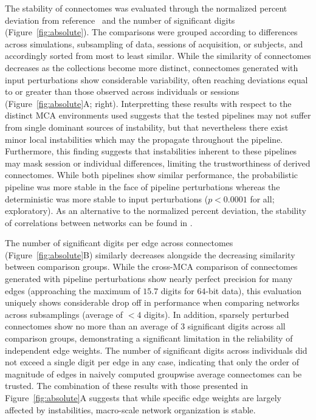 \documentclass[fleqn,10pt]{SelfArx} %
\newcommand{\new}[1]{{\color{blue} #1}}
\begin{document}
The stability of connectomes was evaluated through the \new{normalized percent} deviation from reference~\cite{Kiar2020-lb} and the number
of significant digits
(Figure~\ref{fig:absolute}). The comparisons were grouped according to differences across simulations, subsampling
of data, sessions of acquisition, or subjects, \new{and accordingly sorted from most to least similar}. While the
similarity of connectomes decreases as the collections become
more distinct, connectomes generated with input perturbations show considerable variability, often reaching deviations
equal to or greater than those observed across individuals or sessions (Figure~\ref{fig:absolute}A; right).
\new{Interpretting these results with respect to the distinct MCA environments used suggests that the tested pipelines
may not suffer from single dominant sources of instability, but that nevertheless there exist minor local instabilities
which may the propagate throughout the pipeline. Furthermore,} this
finding suggests that instabilities inherent to these pipelines may mask session or individual differences, limiting
the trustworthiness of derived connectomes. While both pipelines show similar performance, the probabilistic pipeline
was more stable in the face of pipeline perturbations whereas the deterministic was more stable to input perturbations
($p < 0.0001$ for all; exploratory). \new{As an alternative to the normalized percent deviation, the stability of}
correlations \new{between} networks can be found in .

The number of significant digits per edge across connectomes (Figure~\ref{fig:absolute}B) similarly decreases
\new{alongside the decreasing similarity between comparison groups}. While the cross-MCA comparison of connectomes generated with pipeline perturbations show nearly perfect
precision for many edges (approaching the maximum of $15.7$ digits for $64$-bit data), this evaluation uniquely shows
considerable drop off in performance \new{when comparing networks across} subsamplings (average of $< 4$ digits). In addition, \new{sparsely
perturbed connectomes} show no more than an average of $3$ significant digits across all \new{comparison} groups, demonstrating a significant
limitation in the reliability \new{of} independent edge weights. \new{The number of significant digits} across individuals did not exceed a single digit
per edge in any case, indicating that only the order \new{of} magnitude of edges in naively computed groupwise average connectomes can
be trusted. The combination of these results with those presented in Figure~\ref{fig:absolute}A suggests that while
specific edge weights are largely affected by instabilities, macro-scale network \new{organization} is stable.
\end{document}
